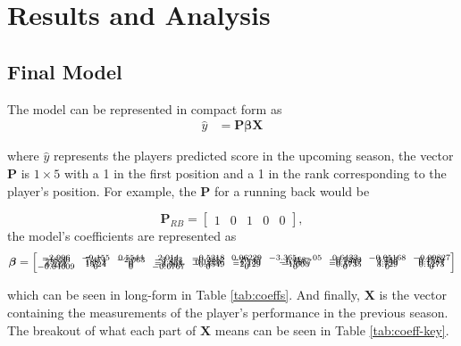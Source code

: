 \chapter{Results and Analysis}
\label{ch:results}
\glsresetall

\vspace{-0.5em}
\section{Final Model}
\vspace{-1.5em}
The model can be represented in compact form as 
\vspace{-1.5em}
\begin{align*}
	\hat y &= \mathbf P\bm\beta\mathbf X
\end{align*}
\vspace{-3em}

where $\hat y$ represents the players predicted score in the upcoming season, 
the vector $\mathbf P$ is $1\times5$ with a 1 in the first position and 
a 1 in the rank corresponding to the player's position. 
For example, the $\mathbf P$ for a running back would be

\vspace{-1.5em}
{\singlespacing \setlength\arraycolsep{1ex}
	\[ \mathbf P_{RB} = \begin{bmatrix} 1 & 0 & 1 & 0 & 0  \end{bmatrix}, \]}
%
the model's coefficients are represented as
%
\vspace{-1.5em}
\[{\scriptsize \setcounter{MaxMatrixCols}{15} \setlength\arraycolsep{1ex}
	\bm{\beta} = 
	\begin{bmatrix}
-2.906  &-9.155 & 0.5544 &  2.014 & -0.5218 & 0.06229&-3.365e-05 &  0.6433 & -0.05168 & -0.09827 \\[-2ex]
-18.36  & 7.471 & -2.063 & -3.253 & -0.2252 & -20.45 &  1.418  &  -0.5383  &  3.783  & 0.2519 \\[-2ex]	
 73.95  & 188.2 &       0& -2.851 &  0.1220 & -1.130 & -0.0867 &  -0.1847  &  2.240  & 0.1581 \\[-2ex]	
 6.214  & 15.24 &       0& -3.403 & -0.4549 & -2.129 & -1.003  &  -0.5735  &  3.729  & 0.1273 \\[-2ex]	
-0.04609&     0 &       0& -0.6767&       0 &      0 &       0 &        0  &       0 &      0 \\	
	\end{bmatrix}
}\]

\vspace{-1em}
which can be seen in long-form in Table \ref{tab:coeffs}. 
And finally, $\mathbf X$ is the vector containing the measurements of the player's performance in the previous season.
The breakout of what each part of $\mathbf{X}$ means can be seen in Table \ref{tab:coeff-key}.

